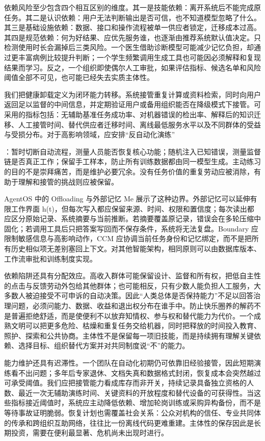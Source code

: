 依赖风险至少包含四个相互区别的维度。其一是技能依赖：离开系统后不能完成原任务。其二是认识依赖：用户无法判断输出是否可信，也不知道模型忽略了什么。其三是基础设施依赖：数据、接口和操作流程被单一供应者锁定，迁移成本过高。其四是规范依赖：何为好结果、应优先服务谁，也逐渐由推荐系统默认值决定。只检测使用时长会漏掉后三类风险。一个医生借助诊断模型可能减少记忆负担，却通过更丰富病例比较提升判断；一个学生频繁调用生成工具也可能因必须解释和复现结果而学习。反之，一个组织即使偶尔人工审批，如果评估指标、候选名单和风险阈值全部不可见，也可能已经失去实质主体性。

我们把健康卸载定义为闭环能力转移。系统接管重复计算或资料检索，同时向用户返回足以监督的中间信息，并定期验证用户或备用组织能否在降级模式下接管。可采用的指标包括：无辅助基准任务成功率、对机器错误的检出率、解释后的知识迁移、人工接管时间、替代供应者迁移时间、离线最低服务水平以及不同群体的受益与受损分布。对于高影响领域，应安排“反自动化演练”

：暂时切断自动流程，测量人员能否恢复核心功能；随机注入已知错误，测量监督链是否真正工作；保留手工样本，防止所有训练数据都由同一模型生成。主动练习的目的不是崇拜痛苦，而是维护必要冗余。没有任务价值的重复劳动应被消除，有助于理解和接管的挑战则应被保留。

AgentOS 中的 Offloading 与外部记忆 Me 展示了这种边界。外部记忆可以延伸有限工作界面 h(t)，但每次写入都应保留来源、时间、权限和置信度；每次读出都应区分原始记录、系统摘要与当前推断。若摘要覆盖原记录，错误会在多轮压缩中固化；若调用工具后只把答案写回而不保存条件，系统将无法复盘。Boundary 应限制敏感信息与高影响动作，CCM 应协调当前任务身份和记忆绑定，而不是把所有历史相似项无差别塞回上下文。对其他智能架构，相同原则可以由数据库版本、工作流审批和训练制度实现。

依赖陷阱还具有分配效应。高收入群体可能保留设计、监督和所有权，把低自主性的点击与反馈劳动外包给其他群体；也可能相反，只有少数人能负担人工服务，大多数人被迫接受不可申诉的自动决策。因此“人类总体是否保持能力”不足以回答治理问题，必须问能力、数据、收益和退出权分布在谁手中。防止快乐圈养的解药不是普遍拒绝舒适，而是使便利不以放弃知情权、参与权和替代能力为代价。一个成熟文明可以把更多危险、枯燥和重复任务交给机器，同时把释放的时间投入教育、照护、探索和公共协商。主体性不是保留每一项旧技能，而是持续拥有理解关键依赖、选择目标、组织替代方案并对共同制度说“不”的能力。

能力维护还具有迟滞性。一个团队在自动化初期仍可依靠旧经验接管，因此短期演练看不出问题；多年后专家退休、文档失真和数据格式封闭，恢复成本会突然越过可承受阈值。我们应把接管能力看成库存而非开关，持续记录具备独立资格的人数、最近一次无辅助演练时间、关键资料的开放程度和替代设备的可获得性。当这些指标接近阈值时，系统应主动降低依赖、增加轮岗训练或采购异构备份，而不是等待事故证明脆弱。恢复计划也需覆盖社会关系：公众对机构的信任、专业共同体的传承和跨组织互助网络，往往比一份离线代码更难重建。主体性的保存因此是长期投资，需要在便利最显著、危机尚未出现时进行。

